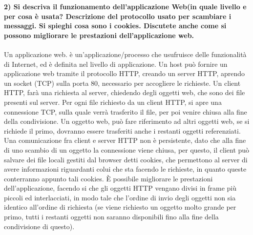 \documentclass[12pt, letterpaper]{article}
\newcommand{\acc}{\\\hphantom{}\\}
\begin{document}
 \textbf{2) Si descriva il funzionamento dell'applicazione Web(in quale livello e per cosa è usata?
  Descrizione del protocollo usato per scambiare i messaggi. Si spieghi cosa sono i cookies. Discutete 
  anche come si possono migliorare le prestazioni dell'applicazione web.}\acc 
Un applicazione web. è un'applicazione/processo che usufruisce delle funzionalità di Internet, ed è definita 
nel livello di applicazione. Un host può fornire un applicazione web tramite il protocollo HTTP, creando un 
server HTTP, aprendo un socket (TCP) sulla porta 80, necessario per accogliere le richieste. Un client HTTP, 
farà una richiesta al server, chiedendo degli oggetti web, che sono dei file presenti sul server. Per ogni file richiesto 
da un client HTTP, si apre una connessione TCP, sulla quale verrà trasferito il file, per poi venire chiusa alla fine della 
condivisione. Un oggetto web, può fare riferimento ad altri oggetti web, se si richiede il primo, dovranno essere 
trasferiti anche i restanti oggetti referenziati. Una comunicazione fra client e server HTTP non è persistente, dato 
che alla fine di uno scambio di un oggetto la connessione viene chiusa, per questo, il client può salvare dei file 
locali gestiti dal browser detti cookies, che permettono al server di avere informazioni riguardanti colui 
che sta facendo le richieste, in quanto queste conterranno appunto tali cookies. 
È possibile migliorare le prestazioni dell'applicazione, facendo si che gli oggetti HTTP vengano divisi in frame 
più piccoli ed interlacciati, in modo tale che l'ordine di invio degli oggetti non sia identico all'ordine di 
richiesta (se viene richiesto un oggetto molto grande per primo, tutti i restanti oggetti non saranno disponibili
fino alla fine della condivisione di questo).  
\end{document}
